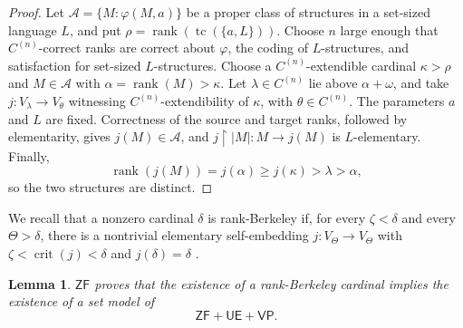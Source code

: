 \documentclass[11pt,a4paper]{amsart}
\newcommand{\VP}{\mathsf{VP}}
\newcommand{\ZF}{\mathsf{ZF}}
\newcommand{\tc}{\operatorname{tc}}
\newcommand{\rank}{\operatorname{rank}}
\newcommand{\restr}{\mathbin{\upharpoonright}}
\newcommand{\crit}{\operatorname{crit}}
\newcommand{\UE}{\mathsf{UE}}
\theoremstyle{plain}
\newtheorem{lemma}[theorem]{Lemma}
\theoremstyle{definition}
\theoremstyle{remark}
\begin{document}
\begin{proof}
 Let $\mathcal A=\{M:\varphi(M,a)\}$ be a proper class of structures in a set-sized language $L$, and put $\rho=\rank(\tc(\{a,L\}))$.  Choose $n$ large enough that $C^{(n)}$-correct ranks are correct about $\varphi$, the coding of $L$-structures, and satisfaction for set-sized $L$-structures.  Choose a $C^{(n)}$-extendible cardinal $\kappa>\rho$ and $M\in\mathcal A$ with $\alpha=\rank(M)>\kappa$.  Let $\lambda\in C^{(n)}$ lie above $\alpha+\omega$, and take $j:V_\lambda\longrightarrow V_\theta$ witnessing $C^{(n)}$-extendibility of $\kappa$, with $\theta\in C^{(n)}$.  The parameters $a$ and $L$ are fixed.  Correctness of the source and target ranks, followed by elementarity, gives $j(M)\in\mathcal A$, and $j\restr|M|:M\to j(M)$ is $L$-elementary.  Finally,
\[
\rank(j(M))=j(\alpha)\geq j(\kappa)>\lambda>\alpha,
\]
so the two structures are distinct.
\end{proof}

We recall that a nonzero cardinal $\delta$ is rank-Berkeley if, for every $\zeta<\delta$ and every $\Theta>\delta$, there is a nontrivial elementary self-embedding $j:V_\Theta\to V_\Theta$ with $\zeta<\crit(j)<\delta$ and $j(\delta)=\delta$ \cite[Definition~4.4]{Mohammd}.

\begin{lemma}\label{lem:rank-Berkeley-descent}
$\ZF$ proves that the existence of a rank-Berkeley cardinal implies the existence of a set model of
\[
\ZF+\UE+\VP.
\]
\end{lemma}
\end{document}
